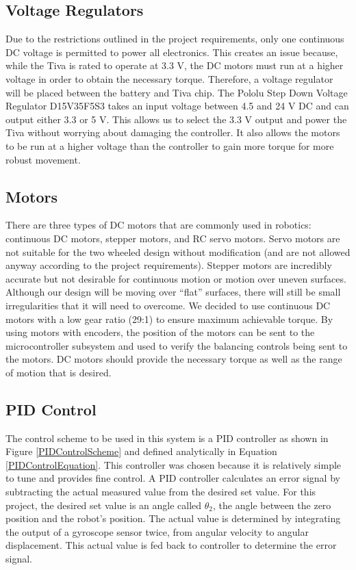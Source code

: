 \documentclass[11pt]{report}
\begin{document}
\begin{spacing}{1.5}
\subsection*{Voltage Regulators}

Due to the restrictions outlined in the project requirements, only one continuous DC voltage is permitted to power all electronics. This creates an issue because, while the Tiva is rated to operate at 3.3 V, the DC motors must run at a higher voltage in order to obtain the necessary torque. Therefore, a voltage regulator will be placed between the battery and Tiva chip. The Pololu Step Down Voltage Regulator D15V35F5S3 takes an input voltage between 4.5 and 24 V DC and can output either 3.3 or 5 V. This allows us to select the 3.3 V output and power the Tiva without worrying about damaging the controller. It also allows the motors to be run at a higher voltage than the controller to gain more torque for more robust movement. 

\subsection*{Motors}

There are three types of DC motors that are commonly used in robotics: continuous DC motors, stepper motors, and RC servo motors. Servo motors are not suitable for the two wheeled design without modification (and are not allowed anyway according to the project requirements). Stepper motors are incredibly accurate but not desirable for continuous motion or motion over uneven surfaces. Although our design will be moving over “flat” surfaces, there will still be small irregularities that it will need to overcome. We decided to use continuous DC motors with a low gear ratio (29:1) to ensure maximum achievable torque. By using motors with encoders, the position of the motors can be sent to the microcontroller subsystem and used to verify the balancing controls being sent to the motors. DC motors should provide the necessary torque as well as the range of motion that is desired.

\subsection*{PID Control}

The control scheme to be used in this system is a PID controller as shown in Figure \ref{PIDControlScheme} and defined analytically in Equation \ref{PIDControlEquation}.  This controller was chosen because it is relatively simple to tune and provides fine control.  A PID controller calculates an error signal by subtracting the actual measured value from the desired set value.  For this project, the desired set value is an angle called $\theta_2$, the angle between the zero position and the robot’s position.  The actual value is determined by integrating the output of a gyroscope sensor twice, from angular velocity to angular displacement.  This actual value is fed back to controller to determine the error signal.


\end{spacing}
\end{document}
